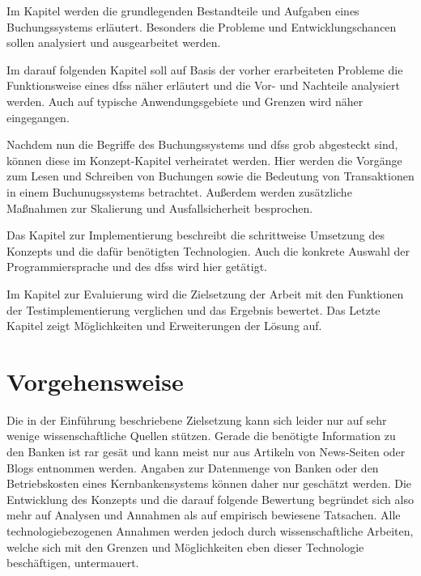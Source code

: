 \documentclass[12pt,oneside,a4paper,parskip]{scrbook}
\begin{document}
Im Kapitel  werden die grundlegenden Bestandteile und Aufgaben eines Buchungssystems erläutert. Besonders die Probleme und Entwicklungschancen sollen analysiert und ausgearbeitet werden.

Im darauf folgenden Kapitel soll auf Basis der vorher erarbeiteten Probleme die Funktionsweise eines \acp{dfs} näher erläutert und die Vor- und Nachteile analysiert werden. Auch auf typische Anwendungsgebiete und Grenzen wird näher eingegangen.

Nachdem nun die Begriffe des Buchungssystems und \acp{dfs} grob abgesteckt sind, können diese im Konzept-Kapitel verheiratet werden. Hier werden die Vorgänge zum Lesen und Schreiben von Buchungen sowie die Bedeutung von Transaktionen in einem Buchunugssystems betrachtet. Außerdem werden zusätzliche Maßnahmen zur Skalierung und Ausfallsicherheit besprochen.

Das Kapitel zur Implementierung beschreibt die schrittweise Umsetzung des Konzepts und die dafür benötigten Technologien. Auch die konkrete Auswahl der Programmiersprache und des \acp{dfs} wird hier getätigt.

Im Kapitel zur Evaluierung wird die Zielsetzung der Arbeit mit den Funktionen der Testimplementierung verglichen und das Ergebnis bewertet. Das Letzte Kapitel zeigt Möglichkeiten und Erweiterungen der Lösung auf.

\chapter{Vorgehensweise}
Die in der Einführung beschriebene Zielsetzung kann sich leider nur auf sehr wenige wissenschaftliche Quellen stützen. Gerade die benötigte Information zu den Banken ist rar gesät und kann meist nur aus Artikeln von News-Seiten oder Blogs entnommen werden. Angaben zur Datenmenge von Banken oder den Betriebskosten eines Kernbankensystems können daher nur geschätzt werden. Die Entwicklung des Konzepts und die darauf folgende Bewertung begründet sich also mehr auf Analysen und Annahmen als auf empirisch bewiesene Tatsachen. Alle technologiebezogenen Annahmen werden jedoch durch wissenschaftliche Arbeiten, welche sich mit den Grenzen und Möglichkeiten eben dieser Technologie beschäftigen, untermauert.
\end{document}
